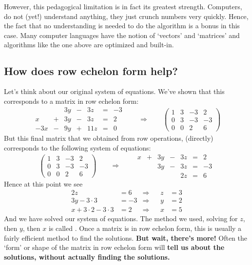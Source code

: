 \documentclass{ximera}
\begin{document}
However, this pedagogical limitation is in fact its greatest
strength. Computers, do not (yet!) understand anything, they just
crunch numbers very quickly. Hence, the fact that no understanding is
needed to do the algorithm is a bonus in this case. Many computer
languages have the notion of `vectors' and `matrices' and algorithms
like the one above are optimized and built-in.




\subsection{How does row echelon form help?}

Let's think about our original system of equations. We've shown that
this corresponds to a matrix in row echelon form:
\[
  \begin{array}{rcrcrcr}
    & & 3y &-& 3z &=& -3 \\
    x& +&3y&-&3z&=&2\\
    -3x& -&9y&+&11z&=&0
  \end{array}
  \qquad\Longrightarrow\qquad
  \left(
    \begin{array}{ccc|c}
      1 &   3 & -3 & 2  \\
      0 &   3 & -3 & -3 \\
      0& 0  & 2 & 6
    \end{array}
  \right)
\]
But this final matrix that we obtained from row operations, (directly)
corresponds to the following system of equations:
\[
  \left(
    \begin{array}{ccc|c}
      1 &   3 & -3 & 2  \\
      0 &   3 & -3 & -3 \\
      0& 0  & 2 & 6
    \end{array}
  \right)
  \qquad\Longrightarrow\qquad
  \begin{array}{ccccccc}
    x  &+ & 3y &-& 3z &=& 2 \\
       &  &3y&-&3z&=&-3\\
       & & & &2z&=&6
  \end{array}
\]
Hence at this point we see
\begin{align*}
  2z &= 6 &\Rightarrow  & & z &= 3\\
  3y-3\cdot 3 &= -3 &\Rightarrow  & & y &= 2\\
  x + 3\cdot 2 - 3\cdot 3 &= 2  &\Rightarrow & & x &= 5
\end{align*}
And we have solved our system of equations. The method we used,
solving for $z$, then $y$, then $x$ is called . Once a matrix is in row echelon form, this is usually
a fairly efficient method to find the solutions.  \textbf{But wait,
  there's more!}  Often the `form' or shape of the matrix in row
echelon form will \textbf{tell us about the solutions, without
  actually finding the solutions.}
\end{document}
